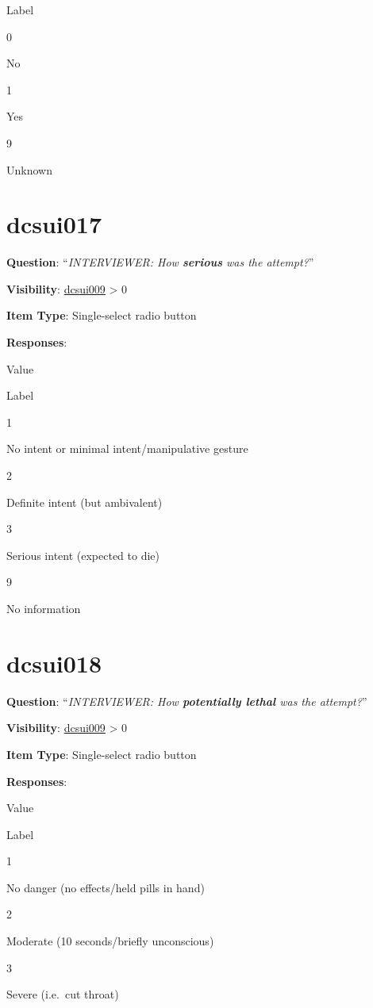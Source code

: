 \documentclass[]{book}
\begin{document}
Label

0

No

1

Yes

9

Unknown

\hypertarget{dcsui017}{%
\section{dcsui017}\label{dcsui017}}

\textbf{Question}: ``\emph{INTERVIEWER: How \textbf{serious} was the attempt?}''

\textbf{Visibility}: \protect\hyperlink{dcsui009}{dcsui009} \textgreater{} 0

\textbf{Item Type}: Single-select radio button

\textbf{Responses}:

Value

Label

1

No intent or minimal intent/manipulative gesture

2

Definite intent (but ambivalent)

3

Serious intent (expected to die)

9

No information

\hypertarget{dcsui018}{%
\section{dcsui018}\label{dcsui018}}

\textbf{Question}: ``\emph{INTERVIEWER: How \textbf{potentially lethal} was the attempt?}''

\textbf{Visibility}: \protect\hyperlink{dcsui009}{dcsui009} \textgreater{} 0

\textbf{Item Type}: Single-select radio button

\textbf{Responses}:

Value

Label

1

No danger (no effects/held pills in hand)

2

Moderate (10 seconds/briefly unconscious)

3

Severe (i.e.~cut throat)
\end{document}
